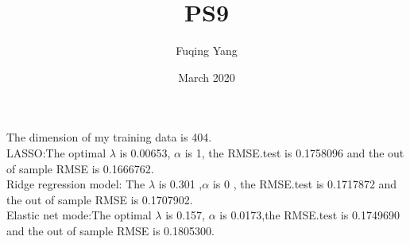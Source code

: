 \documentclass{article}
\title{PS9}
\author{Fuqing Yang}
\date{March 2020}
\begin{document}
\maketitle

\begin{enumerate}
    The dimension of my training data is 404.\\
    LASSO:The optimal $\lambda$ is 0.00653, $\alpha$ is 1, the RMSE.test is 0.1758096 and the out of sample RMSE is 0.1666762.\\
    Ridge regression model: The $\lambda$ is 0.301 ,$\alpha$ is 0 , the RMSE.test is 0.1717872 and the out of sample RMSE is 0.1707902.\\
    Elastic net mode:The optimal $\lambda$ is 0.157, $\alpha$ is 0.0173,the RMSE.test is 0.1749690 and the out of sample RMSE is 0.1805300.\\
\end{enumerate}
\end{document}
